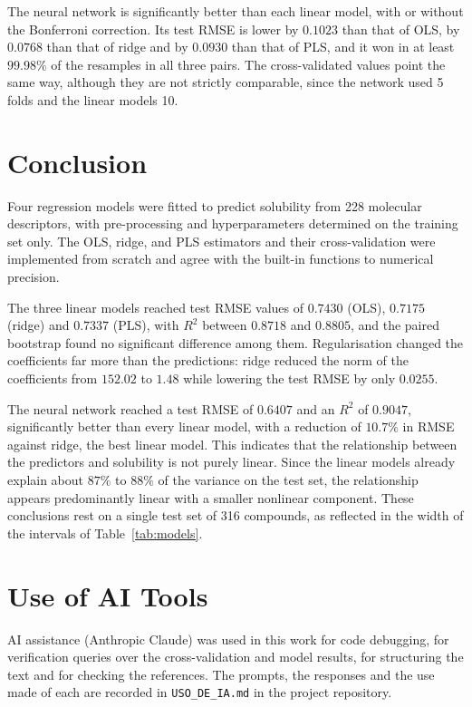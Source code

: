 \documentclass[conference]{IEEEtran}
\begin{document}
The neural network is significantly better than each linear model, with
or without the Bonferroni correction. Its test RMSE is lower by
$0.1023$ than that of OLS, by $0.0768$ than that of ridge and by
$0.0930$ than that of PLS, and it won in at least $99.98\%$ of the
resamples in all three pairs. The cross-validated values point the same
way, although they are not strictly comparable, since the network used
5 folds and the linear models 10.

\section{Conclusion}
\label{sec:conclusion}

Four regression models were fitted to predict solubility from 228
molecular descriptors, with pre-processing and hyperparameters
determined on the training set only. The OLS, ridge, and PLS estimators
and their cross-validation were implemented from scratch and agree with
the built-in functions to numerical precision.

The three linear models reached test RMSE values of $0.7430$ (OLS),
$0.7175$ (ridge) and $0.7337$ (PLS), with $R^2$ between $0.8718$ and
$0.8805$, and the paired bootstrap found no significant difference among
them. Regularisation changed the coefficients far more than the
predictions: ridge reduced the norm of the coefficients from $152.02$ to
$1.48$ while lowering the test RMSE by only $0.0255$.

The neural network reached a test RMSE of $0.6407$ and an $R^2$ of
$0.9047$, significantly better than every linear model, with a reduction
of $10.7\%$ in RMSE against ridge, the best linear model. This indicates
that the relationship between the predictors and solubility is not purely
linear. Since the linear models already explain about $87\%$ to $88\%$ of
the variance on the test set, the relationship appears predominantly
linear with a smaller nonlinear component. These conclusions rest on a
single test set of 316 compounds, as reflected in the width of the
intervals of Table~\ref{tab:models}.

\section*{Use of AI Tools}
AI assistance (Anthropic Claude) was used in this work for code
debugging, for verification queries over the cross-validation and
model results, for structuring the text and for checking the
references. The prompts, the responses and the use made of each are
recorded in \texttt{USO\_DE\_IA.md} in the project repository.



\end{document}
